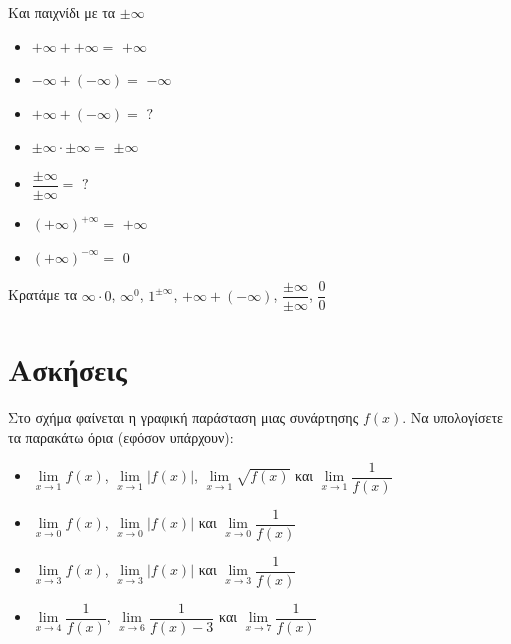 \documentclass{presentation}
\begin{document}
\begin{frame}{Και παιχνίδι με τα $\pm\infty$}
  \begin{multicols}{2}
    \begin{itemize}
      \item $+\infty + +\infty=$ \pause $+\infty$ \pause
      \item $-\infty + (-\infty)=$ \pause $-\infty$ \pause
      \item $+\infty + (-\infty)=$ \pause $?$ \pause
      \item $\pm\infty \cdot \pm\infty=$ \pause $\pm\infty$ \pause
      \item $\dfrac{\pm\infty}{\pm\infty}=$ \pause $?$ \pause
      \item $(+\infty)^{+\infty}=$ \pause $+\infty$ \pause
      \item $(+\infty)^{-\infty}=$ \pause $0$ \pause
    \end{itemize}
  \end{multicols}
  Κρατάμε τα $\infty\cdot 0$, $\infty^0$, $1^{\pm\infty}$, $+\infty + (-\infty)$, $\dfrac{\pm\infty}{\pm\infty}$, $\dfrac{0}{0}$
\end{frame}

\section{Ασκήσεις}
\begin{askisi}
  Στο σχήμα
  \href{https://www.geogebra.org/m/xzc6usbm}{}
  φαίνεται η γραφική παράσταση μιας συνάρτησης $f(x)$. Να υπολογίσετε τα παρακάτω όρια (εφόσον υπάρχουν):
  \begin{itemize}
    \item $\lim\limits_{x \to 1}{ f(x) }$, $\lim\limits_{x \to 1}{ |f(x)| }$, $\lim\limits_{x \to 1}{ \sqrt{f(x)} }$ και $\lim\limits_{x \to 1}{ \dfrac{1}{f(x)} }$ \pause
    \item $\lim\limits_{x \to 0}{ f(x) }$, $\lim\limits_{x \to 0}{ |f(x)| }$ και $\lim\limits_{x \to 0}{ \dfrac{1}{f(x)} }$ \pause
    \item $\lim\limits_{x \to 3}{ f(x) }$, $\lim\limits_{x \to 3}{ |f(x)| }$ και $\lim\limits_{x \to 3}{ \dfrac{1}{f(x)} }$ \pause
    \item $\lim\limits_{x \to 4}{ \dfrac{1}{f(x)} }$, $\lim\limits_{x \to 6}{ \dfrac{1}{f(x)-3} }$ και $\lim\limits_{x \to 7}{ \dfrac{1}{f(x)} }$
  \end{itemize}
\end{askisi}
\end{document}
